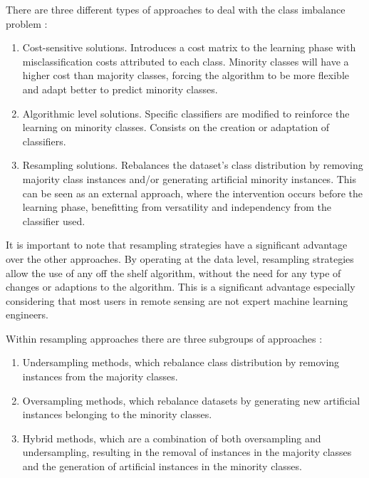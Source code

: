 \documentclass[remotesensing,article,submit,moreauthors,pdftex]{Definitions/mdpi}
\begin{document}
There are three different types of approaches to deal with the class imbalance
problem \cite{Fernandez2013,Kaur2019}:

\begin{enumerate}
    \item Cost-sensitive solutions. Introduces a cost matrix to the learning
        phase with misclassification costs attributed to each class. Minority
        classes will have a higher cost than majority classes, forcing the
        algorithm to be more flexible and adapt better to predict minority
        classes.
    \item Algorithmic level solutions. Specific classifiers are modified to
        reinforce the learning on minority classes. Consists on the creation or
        adaptation of classifiers.
    \item Resampling solutions. Rebalances the dataset's class distribution by
        removing majority class instances and/or generating artificial minority
        instances. This can be seen as an external approach, where the
        intervention occurs before the learning phase, benefitting from
        versatility and independency from the classifier used.
\end{enumerate}

It is important to note that resampling strategies have a significant advantage
over the other approaches. By operating at the data level, resampling strategies
allow the use of any off the shelf algorithm, without the need for any type of
changes or adaptions to the algorithm. This is a significant advantage
especially considering that most users in remote sensing are not expert machine
learning engineers. 

Within resampling approaches there are three subgroups of approaches
\cite{Fernandez2013,Kaur2019,Luengo2020}:

\begin{enumerate}
    \item Undersampling methods, which rebalance class distribution by removing
        instances from the majority classes.
    \item Oversampling methods, which rebalance datasets by generating new
        artificial instances belonging to the minority classes.
    \item Hybrid methods, which are a combination of both oversampling and
        undersampling, resulting in the removal of instances in the majority
        classes and the generation of artificial instances in the minority
        classes.
\end{enumerate}
\end{document}
